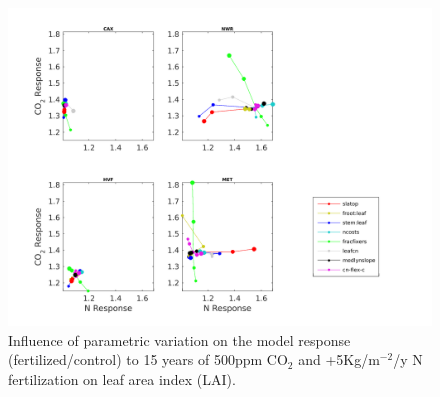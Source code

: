 \usepackage{}\documentclass[draft,linenumbers]{agujournal}
\begin{document}
  \begin{figure}[h]
     \includegraphics[width=1.35\textwidth]{matlab/figures/MAY19jp_relCNdep_defpft_GPP_y2013.png}
     \caption{Influence of parametric variation on the model response (fertilized/control) to 15 years of 500ppm CO$_{2}$ and +5Kg/m$^{-2}$/y N fertilization on leaf area index (LAI).}
     \label{LAI_CN_2016}
  \end{figure}
\end{document}
